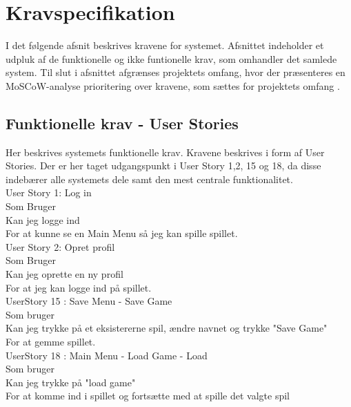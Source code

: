 

\section{Kravspecifikation}
\label{sec:kravspec}

I det følgende afsnit beskrives kravene for systemet. Afsnittet indeholder et udpluk af de funktionelle og ikke funtionelle krav, som omhandler det samlede system.
Til slut i afsnittet afgrænses projektets omfang, hvor der præsenteres en MoSCoW-analyse prioritering over kravene, som sættes for projektets omfang \parencite[Section 6][]{TekniskBilag}.\\  


\subsection{Funktionelle krav - User Stories}
Her beskrives systemets funktionelle krav. Kravene beskrives i form af User Stories. Der er her taget udgangspunkt i User Story 1,2, 15 og 18, da disse indebærer alle systemets dele samt den mest centrale funktionalitet.\\  
 
User Story 1: Log in \\
  Som Bruger \\
  Kan jeg logge ind \\
  For at kunne se en Main Menu så jeg kan spille spillet. \\
  
User Story 2: Opret profil \\
  Som Bruger \\
  Kan jeg oprette en ny profil \\
  For at jeg kan logge ind på spillet. \\
  
UserStory 15 : Save Menu - Save Game\\
  Som bruger \\
  Kan jeg trykke på et eksistererne spil, ændre navnet og trykke "Save Game" \\
  For at gemme spillet.\\

UserStory 18 : Main Menu - Load Game - Load\\
  Som bruger \\
  Kan jeg trykke på "load game" \\
  For at komme ind i spillet og fortsætte med at spille det valgte spil\\


